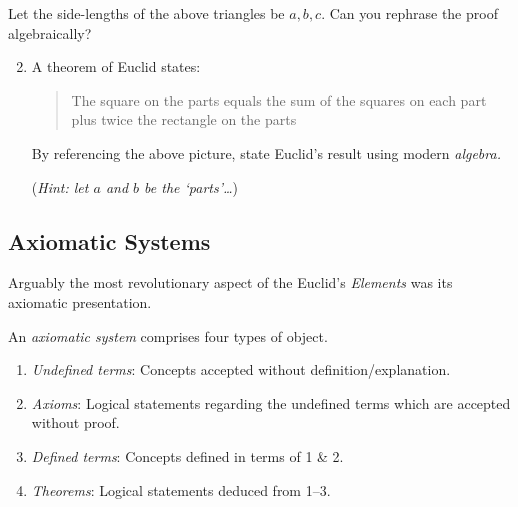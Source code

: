 \begin{exercises}{}{}
	\exstart Let the side-lengths of the above triangles be $a,b,c$. Can you rephrase the proof algebraically?
	\begin{enumerate}\setcounter{enumi}{1}
		\item A theorem of Euclid states:
		\begin{quote}
			The square on the parts equals the sum of the squares on each part plus twice the rectangle on the parts
		\end{quote}
		By referencing the above picture, state Euclid's result using modern \emph{algebra.}\par
		(\emph{Hint: let $a$ and $b$ be the `parts'\ldots})
	\end{enumerate}
\end{exercises}

\clearpage



\subsection{Axiomatic Systems}


Arguably the most revolutionary aspect of the Euclid's \emph{Elements} was its axiomatic presentation.

\begin{defn}{}{}
	An \emph{axiomatic system} comprises four types of object.\vspace{-5pt}
	\begin{enumerate}\itemsep0pt
	  \item \emph{Undefined terms}: Concepts accepted without definition/explanation. %
	  \item \emph{Axioms}: Logical statements regarding the undefined terms which are accepted without proof.
	  \item \emph{Defined terms}: Concepts defined in terms of 1 \& 2.
	  \item \emph{Theorems}: Logical statements deduced from 1--3.
	\end{enumerate}
\end{defn}


